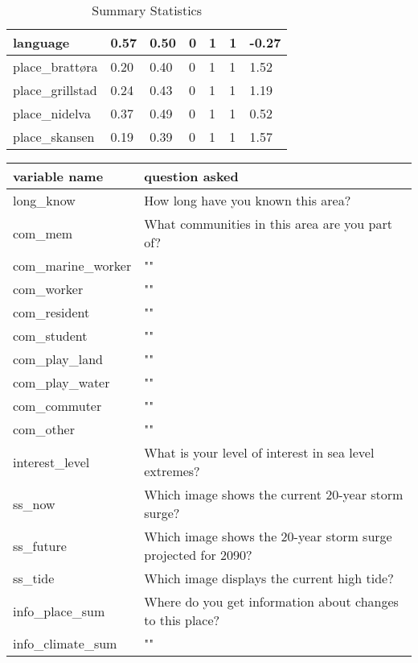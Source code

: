 \begin{center}
\begin{table}[!ht]
\begin{tabular}{|l|l|l|l|l|l|l|}
        language & 0.57 & 0.50 & 0 & 1 & 1 & -0.27  \\ \hline
        place\_brattøra & 0.20 & 0.40 & 0 & 1 & 1 & 1.52  \\ \hline
        place\_grillstad & 0.24 & 0.43 & 0 & 1 & 1 & 1.19 \\ \hline
        place\_nidelva & 0.37 & 0.49 & 0 & 1 & 1 & 0.52 \\ \hline
        place\_skansen & 0.19 & 0.39 & 0 & 1 & 1 & 1.57 \\ \hline
    \end{tabular}
    \caption{Summary Statistics}
\label{table:summary_stats}
\end{table}
\end{center}


\begin{center}
\begin{table}[!ht]
    \centering
    \begin{tabular}{|l|l|}
    \hline
        variable name  & question asked \\ \hline
        long\_know & How long have you known this area? \\ \hline
        com\_mem  & What communities in this area are you part of? \\ \hline
        com\_marine\_worker & "" \\ \hline
        com\_worker & "" \\ \hline
        com\_resident & "" \\ \hline
        com\_student & "" \\ \hline
        com\_play\_land & "" \\ \hline
        com\_play\_water &  "" \\ \hline
        com\_commuter &  "" \\ \hline
        com\_other &  "" \\ \hline
        interest\_level & What is your level of interest in sea level extremes? \\ \hline
        ss\_now  & Which image shows the current 20-year storm surge? \\ \hline
        ss\_future  & Which image shows the 20-year storm surge projected for 2090? \\ \hline
        ss\_tide  & Which image displays the current high tide? \\ \hline
        info\_place\_sum & Where do you get information about changes to this place? \\ \hline
        info\_climate\_sum &  "" \\ \hline

\end{tabular}
\end{table}
\end{center}
